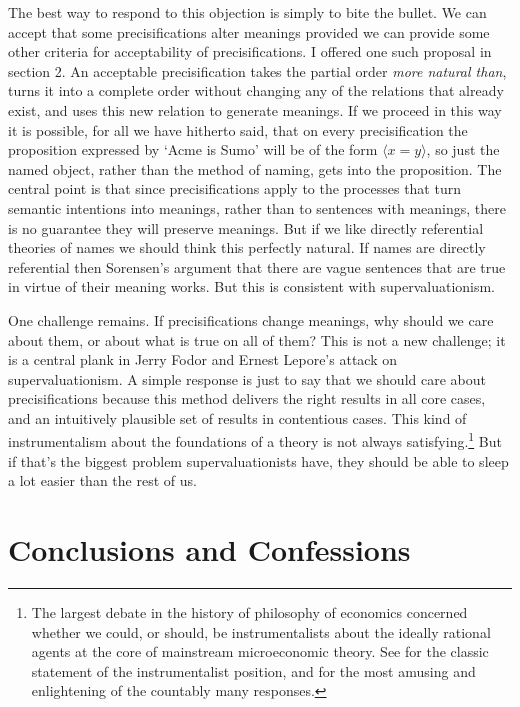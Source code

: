 The best way to respond to this objection is simply to bite the bullet. We can accept that some precisifications alter meanings provided we can provide some other criteria for acceptability of precisifications. I offered one such proposal in section 2. An acceptable precisification takes the partial order \textit{more natural than}, turns it into a complete order without changing any of the relations that already exist, and uses this new relation to generate meanings. If we proceed in this way it is possible, for all we have hitherto said, that on every precisification the proposition expressed by `Acme is Sumo' will be of the form \(\langle x = y \rangle\), so just the named object, rather than the method of naming, gets into the proposition. The central point is that since precisifications apply to the processes that turn semantic intentions into meanings, rather than to sentences with meanings, there is no guarantee they will preserve meanings. But if we like directly referential theories of names we should think this perfectly natural. If names are directly referential then Sorensen's argument that there are vague sentences that are true in virtue of their meaning works. But this is consistent with supervaluationism. 

One challenge remains. If precisifications change meanings, why should we care about them, or about what is true on all of them? This is not a new challenge; it is a central plank in Jerry Fodor and Ernest Lepore's \citeyearpar{Fodor1996} attack on supervaluationism. A simple response is just to say that we should care about precisifications because this method delivers the right results in all core cases, and an intuitively plausible set of results in contentious cases. This kind of instrumentalism about the foundations of a theory is not always satisfying.\footnote{The largest debate in the history of philosophy of economics concerned whether we could, or should, be instrumentalists about the ideally rational agents at the core of mainstream microeconomic theory. See \citet{Friedman1953} for the classic statement of the instrumentalist position, and \citet{Hausman1992} for the most amusing and enlightening of the countably many responses.} But if that's the biggest problem supervaluationists have, they should be able to sleep a lot easier than the rest of us.

\section{Conclusions and Confessions}

